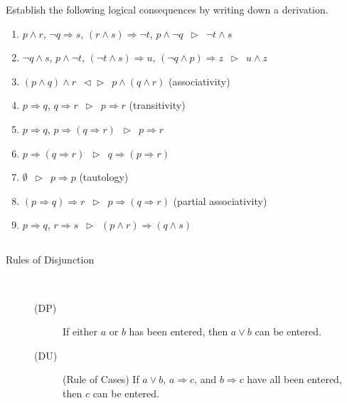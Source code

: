 \documentclass{article}
\newcommand{\0}{\mathbf 0}
\newcommand{\1}{\mathbf 1}
\newcommand{\der}{\vartriangleright}
\newcommand{\red}{\vartriangleleft}
\begin{document}
Establish the following logical consequences by writing down a derivation.
\begin{enumerate}
  \item $p \land r$, $\lnot q \Rightarrow s$, $(r \land s) \Rightarrow \lnot t$, $p \land \lnot q \enspace \der \enspace \lnot t \land s$
  \item $\lnot q \land s$, $p \land \lnot t$, $(\lnot t \land s) \Rightarrow u$, $(\lnot q \land p) \Rightarrow z \enspace \der \enspace u \land z$
  \item $(p \land q) \land r \enspace \red \der \enspace p \land (q \land r)$ \hfill (associativity)
  \item $p \Rightarrow q$, $q \Rightarrow r \enspace \der \enspace p \Rightarrow r$ \hfill (transitivity)
  \item $p \Rightarrow q$, $p \Rightarrow (q \Rightarrow r) \enspace \der \enspace p \Rightarrow r$
  \item $p \Rightarrow (q \Rightarrow r) \enspace \der \enspace q \Rightarrow (p \Rightarrow r)$
  \item $\emptyset \enspace \der \enspace p \Rightarrow p$ \hfill (tautology)
  \item $(p \Rightarrow q) \Rightarrow r \enspace \der \enspace p \Rightarrow (q \Rightarrow r)$ \hfill (partial associativity)
  \item $p \Rightarrow q$, $r \Rightarrow s \enspace \der \enspace (p \land r) \Rightarrow (q \land s)$
\end{enumerate}

\subsection*{ }

\begin{description}
  \item[Rules of Disjunction] $\ $
    \begin{description}
      \item[(DP)] If either $a$ or $b$ has been entered, then $a \lor b$ can be entered.
      \item[(DU)] (Rule of Cases) If $a \lor b$, $a \Rightarrow c$, and $b \Rightarrow c$ have all been entered, then $c$ can be entered.
    \end{description}
\end{description}

\subsection*{ }
\end{document}
